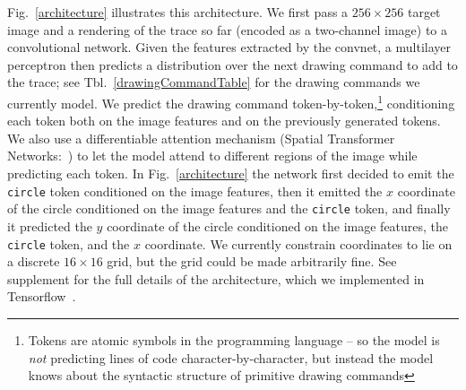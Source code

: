 \documentclass{article}
\newcommand{\remark}[1]{\textcolor{red}{[#1]}}
\theoremstyle{definition}
\begin{document}
Fig.~\ref{architecture} illustrates this architecture.  We first
pass a $256\times 256$ target image and a rendering of the trace so
far (encoded as a two-channel image) to a convolutional network. Given
the features extracted by the convnet, a multilayer perceptron then
predicts a distribution over the next drawing command to add to the
trace; see Tbl.~\ref{drawingCommandTable} for the drawing commands we currently model.  We predict the drawing
command token-by-token,\footnote{Tokens are atomic symbols in the programming language  -- so the model is \emph{not} predicting lines of code character-by-character, but instead the model knows about the syntactic structure of primitive drawing commands} conditioning each token both on the image
features and on the previously generated tokens. We also use a
differentiable attention mechanism (Spatial Transformer
Networks:~\cite{jaderberg2015spatial}) to let the model attend to
different regions of the image while predicting each token. In Fig.~\ref{architecture} the network first decided to emit the \verb|circle| token
conditioned on the image features, then it emitted the $x$ coordinate of
the circle conditioned on the image features and the \verb|circle|
token, and finally it predicted the $y$ coordinate of the circle
conditioned on the image features, the \verb|circle| token, and the
$x$ coordinate. We currently constrain
coordinates to lie on a discrete $16\times 16$ grid,
but the grid could be made arbitrarily fine.  See supplement for the full details
of the architecture, which we implemented in
Tensorflow~\citep{tensorflow2015-whitepaper}.
\end{document}
